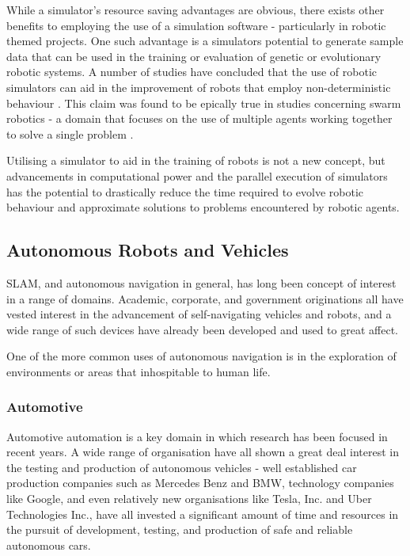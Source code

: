 While a simulator's resource saving advantages are obvious, there exists other
benefits to employing the use of a simulation software - particularly in
robotic themed projects.
One such advantage is a simulators potential to generate sample data that can
be used in the training or evaluation of genetic or evolutionary robotic
systems.
A number of studies have concluded that the use of robotic simulators can
aid in the improvement of robots that employ non-deterministic behaviour
\cite{7139550,7139557}.
This claim was found to be epically true in studies concerning swarm robotics
- a domain that focuses on the use of multiple agents working together to solve
a single problem \cite{Wischmann864,R2016,Yao2014}.

Utilising a simulator to aid in the training of robots is not a new concept,
but advancements in computational power and the parallel execution of
simulators has the potential to drastically reduce the time required to evolve
robotic behaviour and approximate solutions to problems encountered by robotic
agents.

\pagebreak

\subsection{Autonomous Robots and Vehicles}
SLAM, and autonomous navigation in general, has long been concept of interest
in a range of domains.
Academic, corporate, and government originations all have vested interest in
the advancement of self-navigating vehicles and robots, and a wide range of
such devices have already been developed and used to great affect.

One of the more common uses of autonomous navigation is in the exploration of
environments or areas that inhospitable to human life.

\subsubsection{Automotive}
Automotive automation is a key domain in which research has been focused in
recent years.
A wide range of organisation have all shown a great deal interest in the testing
and production of autonomous vehicles - well established car production companies
such as Mercedes Benz and BMW, technology companies like Google, and even
relatively new organisations like Tesla, Inc. and Uber Technologies Inc., have
all invested a significant amount of time and resources in the pursuit of
development, testing, and production of safe and reliable autonomous cars.

